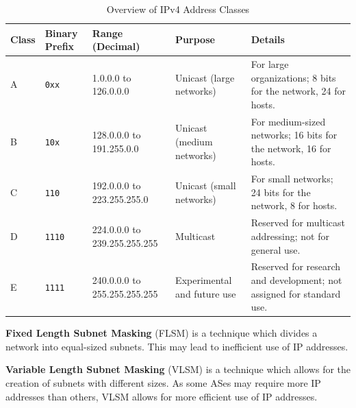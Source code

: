 \begin{table}[h!]
    \centering
    \begin{tabular}{@{}p{.1cm}p{1.1cm}p{2cm}p{3cm}p{4cm}@{}}
    \toprule
    \textbf{Class} & \textbf{Binary Prefix} & \textbf{Range (Decimal)} & \textbf{Purpose} & \textbf{Details} \\ \midrule
    A              & \texttt{0xx}           & 1.0.0.0 to 126.0.0.0     & Unicast (large networks) & For large organizations; 8 bits for the network, 24 for hosts. \\
    B              & \texttt{10x}           & 128.0.0.0 to 191.255.0.0 & Unicast (medium networks) & For medium-sized networks; 16 bits for the network, 16 for hosts. \\
    C              & \texttt{110}           & 192.0.0.0 to 223.255.255.0 & Unicast (small networks) & For small networks; 24 bits for the network, 8 for hosts. \\
    D              & \texttt{1110}          & 224.0.0.0 to 239.255.255.255 & Multicast & Reserved for multicast addressing; not for general use. \\
    E              & \texttt{1111}          & 240.0.0.0 to 255.255.255.255 & Experimental and future use & Reserved for research and development; not assigned for standard use. \\ \bottomrule
    \end{tabular}
    \caption{Overview of IPv4 Address Classes}
    \label{tab:ipv4_classes}
\end{table}






\newpage 

\noindent 

\begin{Def}

    \textbf{Fixed Length Subnet Masking} (FLSM) is a technique which divides a network into equal-sized subnets. This
    may lead to inefficient use of IP addresses.
    \hfill \cite{awati_vlsm}
\end{Def}
\begin{Def}

    \textbf{Variable Length Subnet Masking} (VLSM) is a technique which allows for the creation of subnets with different sizes. 
    As some ASes may require more IP addresses than others, VLSM allows for more efficient use of IP addresses.
    \hfill \cite{awati_vlsm}
\end{Def}
\noindent

